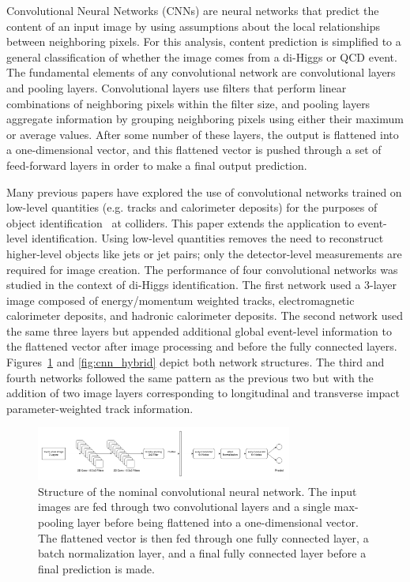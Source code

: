 \label{sec:CNN}
Convolutional Neural Networks (CNNs) are neural networks that predict the content of an input image by using assumptions about the local relationships between neighboring pixels. For this analysis, content prediction is simplified to a general classification of whether the image comes from a di-Higgs or QCD event. The fundamental elements of any convolutional network are convolutional layers and pooling layers. Convolutional layers use filters that perform linear combinations of neighboring pixels within the filter size, and pooling layers aggregate information by grouping neighboring pixels using either their maximum or average values. After some number of these layers, the output is flattened into a one-dimensional vector, and this flattened vector is pushed through a set of feed-forward layers in order to make a final output prediction. 

Many previous papers have explored the use of convolutional networks trained on low-level quantities (e.g. tracks and calorimeter deposits) for the purposes of object identification~\cite{Alison:2019kud} at colliders. This paper extends the application to event-level identification. Using low-level quantities removes the need to reconstruct higher-level objects like jets or jet pairs; only the detector-level measurements are required for image creation. The performance of four convolutional networks was studied in the context of di-Higgs identification. The first network used a 3-layer image composed of energy/momentum weighted tracks, electromagnetic calorimeter deposits, and hadronic calorimeter deposits. The second network used the same three layers but appended additional global event-level information to the flattened vector after image processing and before the fully connected layers. Figures~\ref{fig:cnn_nominal} and \ref{fig:cnn_hybrid} depict both network structures. The third and fourth networks followed the same pattern as the previous two but with the addition of two image layers corresponding to longitudinal and transverse impact parameter-weighted track information.

\begin{figure}[!h] 
\begin{center}
\includegraphics*[width=0.75\textwidth] {CNN/figures/nominalCNN.png}
\caption{Structure of the nominal convolutional neural network. The input images are fed through two convolutional layers and a single max-pooling layer before being flattened into a one-dimensional vector. The flattened vector is then fed through one fully connected layer, a batch normalization layer, and a final fully connected layer before a final prediction is made.}
  \label{fig:cnn_nominal}
\end{center}
\end{figure}

